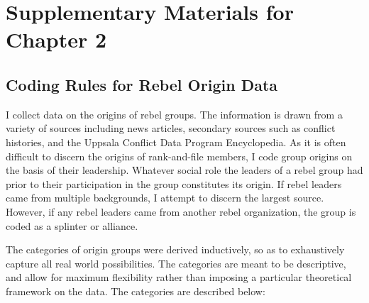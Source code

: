 \documentclass[12pt,]{book}
\theoremstyle{definition}
\theoremstyle{definition}
\theoremstyle{definition}
\theoremstyle{remark}
\begin{document}
\setcounter{table}{0}\setcounter{section}{0}

\hypertarget{supplementary-materials-for-chapter-2}{%
\section{Supplementary Materials for Chapter
2}\label{supplementary-materials-for-chapter-2}}

\hypertarget{coding-rules-for-rebel-origin-data}{%
\subsection*{Coding Rules for Rebel Origin
Data}\label{coding-rules-for-rebel-origin-data}}

I collect data on the origins of rebel groups. The information is drawn
from a variety of sources including news articles, secondary sources
such as conflict histories, and the Uppsala Conflict Data Program
Encyclopedia. As it is often difficult to discern the origins of
rank-and-file members, I code group origins on the basis of their
leadership. Whatever social role the leaders of a rebel group had prior
to their participation in the group constitutes its origin. If rebel
leaders came from multiple backgrounds, I attempt to discern the largest
source. However, if any rebel leaders came from another rebel
organization, the group is coded as a splinter or alliance.

The categories of origin groups were derived inductively, so as to
exhaustively capture all real world possibilities. The categories are
meant to be descriptive, and allow for maximum flexibility rather than
imposing a particular theoretical framework on the data. The categories
are described below:
\end{document}

